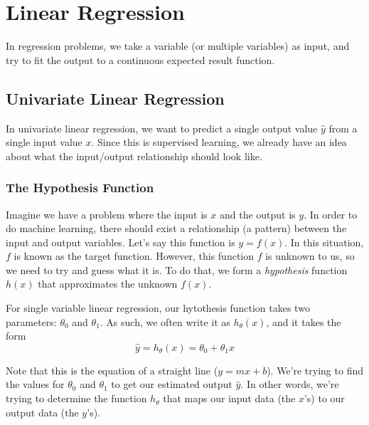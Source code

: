 \chapter{Linear Regression}
\label{chap:linreg}

In regression problems, we take a variable (or multiple variables) as input, and try to fit the output to a continuous expected result function. 



\section{Univariate Linear Regression}
\label{chaplinreg-sect:univar}

In univariate linear regression, we want to predict a single output value $\hat{y}$ from a single input value $x$. Since this is supervised learning, we already have an idea about what the input/output relationship should look like. 



\subsection{The Hypothesis Function}
\label{chaplinreg-sectunivar-subsect:hypfunct}

Imagine we have a problem where the input is $x$ and the output is $y$. In order to do machine learning, there should exist a relationship (a pattern) between the input and output variables. Let's say this function is $y = f\left( x \right)$. In this situation, $f$ is known as the target function. However, this function $f$ is unknown to us, so we need to try and guess what it is. To do that, we form a \textit{hypothesis} function $h\left( x \right)$ that approximates the unknown $f\left( x \right)$. 

For single variable linear regression, our hytothesis function takes two parameters: $\theta_0$ and $\theta_1$. As such, we often write it as $h_\theta\left( x \right)$, and it takes the form
\begin{equation}
\hat{y} = h_\theta\left( x \right) = \theta_0 + \theta_1 x
\end{equation}

Note that this is the equation of a straight line ($y = mx + b$). We're trying to find the values for $\theta_0$ and $\theta_1$ to get our estimated output $\hat{y}$. In other words, we're trying to determine the function $h_\theta$ that maps our input data (the $x$'s) to our output data (the $y$'s). 

